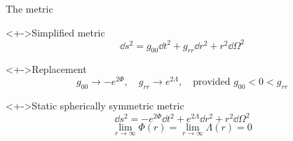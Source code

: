 \documentclass{beamer}
\let\svthefootnote\thefootnote
\newcommand\blankfootnote[1]{%
  \let\thefootnote\relax\footnotetext{#1}%
  \let\thefootnote\svthefootnote%
}
\begin{document}

\begin{frame}{The metric}

\begin{block}<+->{Simplified metric}
\begin{displaymath}
  \dd{s}^2 =
  g_{00} \dd{t}^2 +
  g_{rr} \dd{r}^2 +
  r^2 \dd\Omega^2
\end{displaymath}
\end{block}

\begin{block}<+->{Replacement}
\begin{displaymath}
  g_{00} \to -e^{2\Phi},
  \quad
  g_{rr} \to e^{2\Lambda},
  \quad
  \text{provided $g_{00} < 0 < g_{rr}$}
\end{displaymath}
\end{block}

\begin{block}<+->{Static spherically symmetric metric}
\begin{displaymath}
  \dd{s}^2 =
  -e^{2\Phi} \dd{t}^2 +
  e^{2\Lambda} \dd{r}^2 +
  r^2 \dd\Omega^2
\end{displaymath}
\begin{displaymath}
  \lim_{r\to\infty} \Phi(r) = \lim_{r\to\infty} \Lambda(r) = 0
\end{displaymath}
\end{block}

\blankfootnote{\textcite[pp. 258--259]{Schutz}}



\end{frame}

\end{document}
